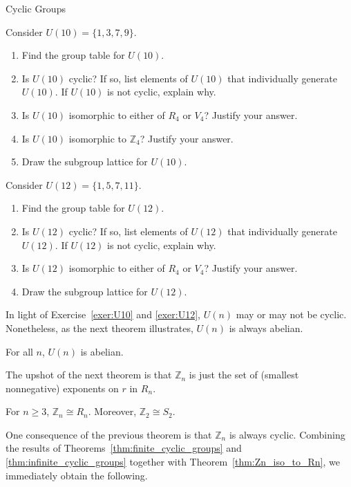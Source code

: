 \begin{section}{Cyclic Groups}
\begin{exercise}\label{exer:U10}
Consider $U(10)=\{1,3,7,9\}$.
\begin{enumerate}[label=\rm{(\alph*)}]
\item Find the group table for $U(10)$.
\item Is $U(10)$ cyclic? If so, list elements of $U(10)$ that individually generate $U(10)$.  If $U(10)$ is not cyclic, explain why.
\item Is $U(10)$ isomorphic to either of $R_4$ or $V_4$? Justify your answer.
\item Is $U(10)$ isomorphic to $\mathbb{Z}_4$? Justify your answer.
\item Draw the subgroup lattice for $U(10)$.
\end{enumerate}
\end{exercise}

\begin{exercise}\label{exer:U12}
Consider $U(12)=\{1,5,7,11\}$.
\begin{enumerate}[label=\rm{(\alph*)}]
\item Find the group table for $U(12)$.
\item Is $U(12)$ cyclic? If so, list elements of $U(12)$ that individually generate $U(12)$.  If $U(12)$ is not cyclic, explain why.
\item Is $U(12)$ isomorphic to either of $R_4$ or $V_4$? Justify your answer.
\item Draw the subgroup lattice for $U(12)$.
\end{enumerate}
\end{exercise}

In light of Exercise~\ref{exer:U10} and \ref{exer:U12}, $U(n)$ may or may not be cyclic. Nonetheless, as the next theorem illustrates, $U(n)$ is always abelian.

\begin{theorem}
For all $n$, $U(n)$ is abelian.
\end{theorem}

The upshot of the next theorem is that $\mathbb{Z}_n$ is just the set of (smallest nonnegative) exponents on $r$ in $R_n$.

\begin{theorem}\label{thm:Zn_iso_to_Rn}
For $n\geq 3$, $\mathbb{Z}_n\cong R_n$. Moreover, $\mathbb{Z}_2\cong S_2$.
\end{theorem}

One consequence of the previous theorem is that $\mathbb{Z}_n$ is always cyclic. Combining the results of Theorems~\ref{thm:finite_cyclic_groups} and \ref{thm:infinite_cyclic_groups} together with Theorem~\ref{thm:Zn_iso_to_Rn}, we immediately obtain the following.


\end{section}
